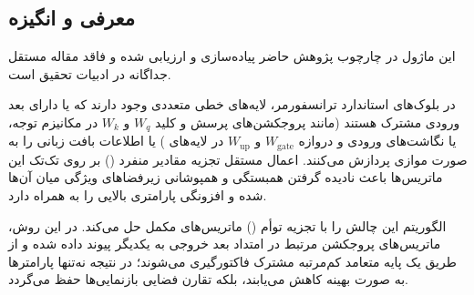 \subsection{معرفی و انگیزه}
این ماژول در چارچوب پژوهش حاضر پیاده‌سازی و ارزیابی شده و فاقد مقاله مستقل جداگانه در ادبیات تحقیق است.

در بلوک‌های استاندارد ترانسفورمر، لایه‌های خطی متعددی وجود دارند که یا دارای بعد ورودی مشترک هستند (مانند پروجکشن‌های پرسش و کلید $W_q$ و $W_k$ در مکانیزم توجه، یا نگاشت‌های ورودی و دروازه $W_{\text{gate}}$ و $W_{\text{up}}$ در لایه‌های ) یا اطلاعات بافت زبانی را به صورت موازی پردازش می‌کنند. اعمال مستقل تجزیه مقادیر منفرد () بر روی تک‌تک این ماتریس‌ها باعث نادیده گرفتن همبستگی و همپوشانی زیرفضاهای ویژگی میان آن‌ها شده و افزونگی پارامتری بالایی را به همراه دارد.

الگوریتم  این چالش را با تجزیه توأم () ماتریس‌های مکمل حل می‌کند. در این روش، ماتریس‌های پروجکشن مرتبط در امتداد بعد خروجی به یکدیگر پیوند داده شده و از طریق یک پایه متعامد کم‌مرتبه مشترک فاکتورگیری می‌شوند؛ در نتیجه نه‌تنها پارامترها به صورت بهینه کاهش می‌یابند، بلکه تقارن فضایی بازنمایی‌ها حفظ می‌گردد.
